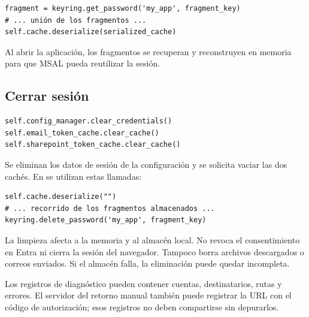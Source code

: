 \documentclass[11pt,a4paper]{article}
\newcommand{\codigo}[1]{\texttt{\detokenize{#1}}}
\newcommand{\archivo}[1]{{\small\path{#1}}\par}
\begin{document}
\begin{lstlisting}
fragment = keyring.get_password('my_app', fragment_key)
# ... unión de los fragmentos ...
self.cache.deserialize(serialized_cache)
\end{lstlisting}
Al abrir la aplicación, los fragmentos se recuperan y reconstruyen en
memoria para que MSAL pueda reutilizar la sesión.

\subsection*{Cerrar sesión}
\archivo{src/gui/app.py}
\begin{lstlisting}
self.config_manager.clear_credentials()
self.email_token_cache.clear_cache()
self.sharepoint_token_cache.clear_cache()
\end{lstlisting}
Se eliminan los datos de sesión de la configuración y se solicita vaciar
las dos cachés. En \codigo{clear_cache()} se utilizan estas llamadas:
\begin{lstlisting}
self.cache.deserialize("")
# ... recorrido de los fragmentos almacenados ...
keyring.delete_password('my_app', fragment_key)
\end{lstlisting}
La limpieza afecta a la memoria y al almacén local. No revoca el
consentimiento en Entra ni cierra la sesión del navegador. Tampoco borra
archivos descargados o correos enviados. Si el almacén falla, la eliminación
puede quedar incompleta.

Los registros de diagnóstico pueden contener cuentas, destinatarios,
rutas y errores. El servidor del retorno manual también puede registrar
la URL con el código de autorización; esos registros no deben compartirse
sin depurarlos.
\end{document}
